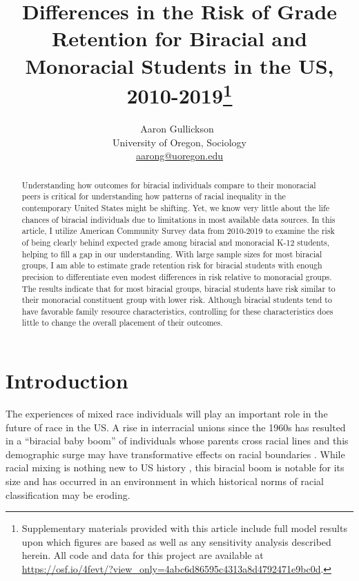 \documentclass[
  12pt,
  letterpaper,
]{article}
\title{Differences in the Risk of Grade Retention for Biracial and
Monoracial Students in the US, 2010-2019\thanks{Supplementary materials
provided with this article include full model results upon which figures
are based as well as any sensitivity analysis described herein. All code
and data for this project are available at
\url{https://osf.io/4fevt/?view_only=4abc6d86595c4313a8d4792471e9bc0d}.}}
\author{
Aaron Gullickson~\orcidlink{0000-0001-7237-8131}\\University of
Oregon, Sociology\\\href{mailto:aarong@uoregon.edu}{aarong@uoregon.edu}}
\date{}
\begin{document}
\maketitle
\begin{abstract}
Understanding how outcomes for biracial individuals compare to their
monoracial peers is critical for understanding how patterns of racial
inequality in the contemporary United States might be shifting. Yet, we
know very little about the life chances of biracial individuals due to
limitations in most available data sources. In this article, I utilize
American Community Survey data from 2010-2019 to examine the risk of
being clearly behind expected grade among biracial and monoracial K-12
students, helping to fill a gap in our understanding. With large sample
sizes for most biracial groups, I am able to estimate grade retention
risk for biracial students with enough precision to differentiate even
modest differences in risk relative to monoracial groups. The results
indicate that for most biracial groups, biracial students have risk
similar to their monoracial constituent group with lower risk. Although
biracial students tend to have favorable family resource
characteristics, controlling for these characteristics does little to
change the overall placement of their outcomes.
\end{abstract}

\ifdefined\Shaded\renewenvironment{Shaded}{\begin{tcolorbox}[frame hidden, boxrule=0pt, borderline west={3pt}{0pt}{shadecolor}, enhanced, interior hidden, breakable, sharp corners]}{\end{tcolorbox}}\fi

\hypertarget{introduction}{%
\section{Introduction}\label{introduction}}

The experiences of mixed race individuals will play an important role in
the future of race in the US. A rise in interracial unions since the
1960s has resulted in a ``biracial baby boom'' of individuals whose
parents cross racial lines \autocite{root_racially_1992} and this
demographic surge may have transformative effects on racial boundaries
\autocite{hochschild_creating_2012,alba_great_2020}. While racial mixing
is nothing new to US history
\autocite{morning_who_2000,gullickson_choosing_2011}, this biracial boom
is notable for its size and has occurred in an environment in which
historical norms of racial classification may be eroding.
\end{document}
